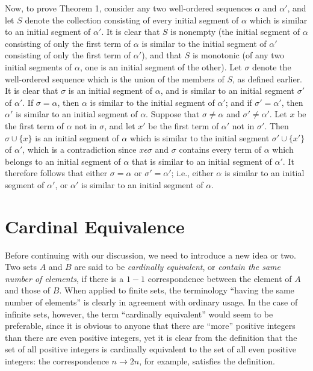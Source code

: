 \documentclass{article}
\begin{document}
Now, to prove Theorem 1, consider any two well-ordered sequences $\alpha$ and $\alpha'$, and let $S$ denote the collection consisting of every initial segment of $\alpha$ which is similar to an initial segment of $\alpha'$. It is clear that $S$ is nonempty (the initial segment of $\alpha$ consisting of only the first term of $\alpha$ is similar to the initial segment of $\alpha'$ consisting of only the first term of $\alpha'$), and that $S$ is monotonic (of any two initial segments of $\alpha$, one is an initial segment of the other). Let $\sigma$ denote the well-ordered sequence which is the union of the members of $S$, as defined earlier. It is clear that $\sigma$ is an initial segment of $\alpha$, and is similar to an initial segment $\sigma'$ of $\alpha'$. If $\sigma = \alpha$, then $\alpha$ is similar to the initial segment of $\alpha'$; and if $\sigma' = \alpha'$, then $\alpha'$ is similar to an initial segment of $\alpha$. Suppose that $\sigma \neq \alpha$ and $\sigma' \neq \alpha'$. Let $x$ be the first term of $\alpha$ not in $\sigma$, and let $x'$ be the first term of $\alpha'$ not in $\sigma'$. Then $\sigma \cup \{ x \}$ is an initial segment of $\alpha$ which is similar to the initial segment $\sigma' \cup \{ x' \}$ of $\alpha'$, which is a contradiction since $x \epsilon \sigma$ and $\sigma$ contains every term of $\alpha$ which belongs to an initial segment of $\alpha$ that is similar to an initial segment of $\alpha'$. It therefore follows that either $\sigma = \alpha$ or $\sigma' = \alpha'$; i.e., either $\alpha$ is similar to an initial segment of $\alpha'$, or $\alpha'$ is similar to an initial segment of $\alpha$.


\section{Cardinal Equivalence}


Before continuing with our discussion, we need to introduce a new idea or two. Two sets $A$ and $B$ are said to be \emph{cardinally equivalent}, or \emph{contain the same number of elements}, if there is a $1-1$ correspondence between the element of $A$ and those of $B$. When applied to finite sets, the terminology ``having the same number of elements'' is clearly in agreement with ordinary usage. In the case of infinite sets, however, the term ``cardinally equivalent'' would seem to be preferable, since it is obvious to anyone that there are ``more'' positive integers than there are even positive integers, yet it is clear from the definition that the set of all positive integers is cardinally equivalent to the set of all even positive integers: the correspondence $n \rightarrow 2n$, for example, satisfies the definition.
\end{document}
